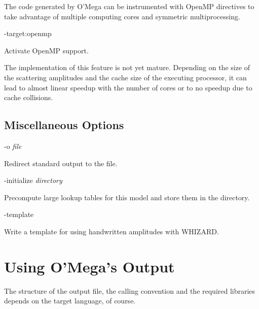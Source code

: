 \documentclass[12pt,a4paper]{article}
\newenvironment{options}%
 {\begin{list}{}%
   {\setlength{\leftmargin}{3em}%
    \setlength{\rightmargin}{3em}%
    \setlength{\itemindent}{1em}%
    \setlength{\listparindent}{0pt}%
    \settowidth{\labelwidth}{5em}%
    \renewcommand{\makelabel}[1]{\texttt{##1}}}}%
 {\end{list}}
\begin{document}
The code generated by O'Mega can be instrumented with
OpenMP directives to take advantage of multiple
computing cores and symmetric multiprocessing.
\begin{options}
  \item[-target:openmp] \hfil\par
    Activate OpenMP support.
\end{options}
The implementation of this feature is not yet mature.  Depending on
the size of the scattering amplitudes and the cache size of the
executing processor, it can lead to almost linear speedup with the
number of cores or to no speedup due to cache collisions.
\subsection{Miscellaneous Options}
\begin{options}
  \item[-o] \textit{file}\par
    Redirect standard output to the file.
  \item[-initialize] \textit{directory}\par
    Precompute large lookup tables for this model and store them in the directory.
  \item[-template]\hfil\par
    Write a template for using handwritten amplitudes with WHIZARD.
\end{options}
\section{Using O'Mega's Output}
\label{sec:using}
The structure of the output file, the calling convention and the
required libraries depends on the target language, of course.
\end{document}
